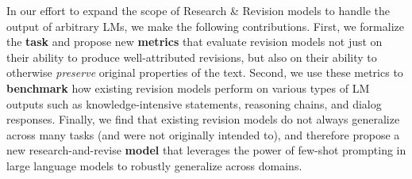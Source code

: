 In our effort to expand the scope of Research \& Revision models to handle the output of arbitrary LMs, we make the following contributions.
First, we formalize the \taskName{} \textbf{task} and propose new \textbf{metrics} that evaluate revision models not just on their ability to produce well-attributed revisions, but also on their ability to otherwise \emph{preserve} original properties of the text.
Second, we use these metrics to \textbf{benchmark} how existing revision models perform on various types of LM outputs such as knowledge-intensive statements, reasoning chains, and dialog responses.
Finally, we find that existing revision models do not always generalize across many tasks (and were not originally intended to), and therefore propose a new research-and-revise \textbf{model} that leverages the power of few-shot prompting in large language models to robustly generalize across domains.